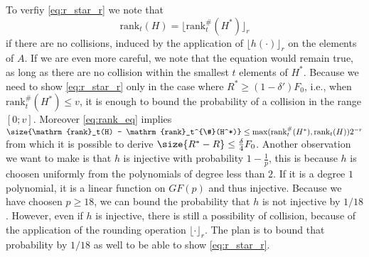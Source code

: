 \documentclass[11pt,a4paper]{article}
\begin{document}
To verfiy \autoref{eq:r_star_r} we note that
\begin{equation}
    \label{eq:rank_eq}
    \mathrm{rank}_t(H) = \lfloor \mathrm{rank}_t^{\#}(H^*) \rfloor_r
\end{equation}
if there are no collisions, induced by the application of $\lfloor h(\cdot) \rfloor_r$ on the elements of $A$.
If we are even more careful, we note that the equation would remain true, as long as there are no collision within the smallest $t$ elements of $H^*$.
Because we need to show \autoref{eq:r_star_r} only in the case where $R^* \geq (1-\delta') F_0$, i.e., when $\mathrm{rank}_t^{\#}(H^*) \leq v$,
it is enough to bound the probability of a collision in the range $[0; v]$.
Moreover \autoref{eq:rank_eq} implies $\size{\mathrm{rank}_t(H) - \mathrm{rank}_t^{\#}(H^*)} \leq \max(\mathrm{rank}_t^{\#}(H^*), \mathrm{rank}_t(H)) 2^{-r}$ from
which it is possible to derive $\size{R^*-R} \leq \frac{\delta}{4} F_0$.
%
Another observation we want to make is that $h$ is injective with probability $1-\frac{1}{p}$, this is because $h$ is choosen uniformly from the polynomials of degree less than $2$.
If it is a degree $1$ polynomial, it is a linear function on $GF(p)$ and thus injective.
Because we have choosen $p \geq 18$, we can bound the probability that $h$ is not injective by $1/18$.
However, even if $h$ is injective, there is still a possibility of collision, because of the application of the rounding operation $\lfloor \cdot \rfloor_r$. 
The plan is to bound that probability by $1/18$ as well to be able to show \autoref{eq:r_star_r}.
\end{document}
